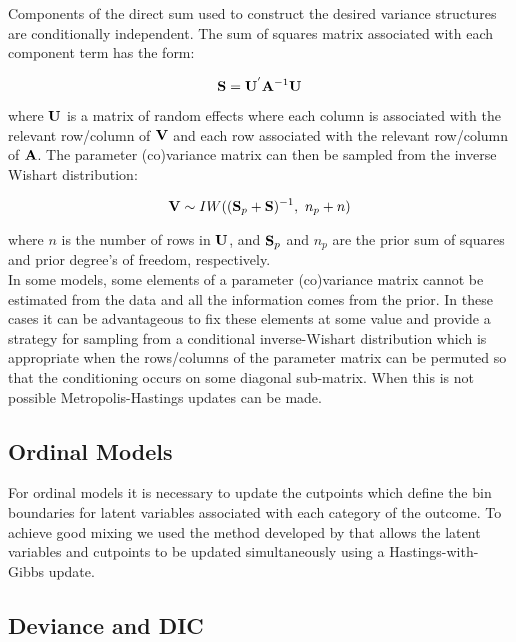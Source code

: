 \documentclass{article}
\begin{document}
Components of the direct sum used to construct the desired variance structures are conditionally independent.  The sum of squares matrix associated with each component term has the form:

\begin{equation}
{\bf S} = {\bf U}^{'}{\bf A}^{-1}{\bf U}
\end{equation}

where ${\bf U}$ is a matrix of random effects where each column is associated with the relevant row/column of ${\bf V}$ and each row associated with the relevant row/column of ${\bf A}$. The parameter (co)variance matrix can then be sampled from the inverse Wishart distribution:


\begin{equation}
{\bf V} \sim IW(({\bf S}_{p}+{\bf S})^{-1},\ n_{p}+n)
\label{pIW-Eq}
\end{equation}

where $n$ is the number of rows in ${\bf U}$, and ${\bf S}_{p}$ and $n_{p}$ are the prior sum of squares and prior degree's of freedom, respectively.\\

In some models, some elements of a parameter (co)variance matrix cannot be estimated from the data and all the information comes from the prior. In these cases it can be advantageous to fix these elements at some value and \citet{Korsgaard.1999} provide a strategy for sampling from a conditional inverse-Wishart distribution which is appropriate when the rows/columns of the parameter matrix can be permuted so that the conditioning occurs on some diagonal sub-matrix. When this is not possible Metropolis-Hastings updates can be made. 

\subsection{Ordinal Models}

For ordinal models it is necessary to update the cutpoints which define the bin boundaries for latent variables associated with each category of the outcome.  To achieve good mixing we used the method developed by \citep{Cowles.1996} that allows the latent variables and cutpoints to be updated simultaneously using a Hastings-with-Gibbs update.


\subsection{Deviance and DIC}
\end{document}
